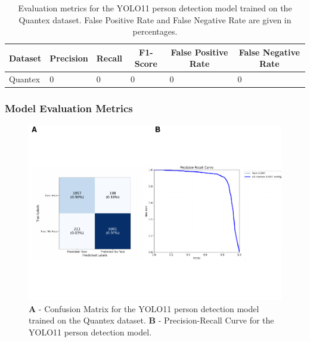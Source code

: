 \documentclass[
  man,floatsintext]{apa6}
\begin{document}
\begin{table}[tbp]

\begin{center}
\begin{threeparttable}

\caption{\label{tab:person-detection-metrics-detailed}Evaluation metrics for the YOLO11 person detection model trained on the Quantex dataset. False Positive Rate and False Negative Rate are given in percentages.}

\begin{tabular}{llllll}
\toprule
Dataset & \multicolumn{1}{c}{Precision} & \multicolumn{1}{c}{Recall} & \multicolumn{1}{c}{F1-Score} & \multicolumn{1}{c}{False Positive Rate} & \multicolumn{1}{c}{False Negative Rate}\\
\midrule
Quantex & 0 & 0 & 0 & 0 & 0\\
\bottomrule
\end{tabular}

\end{threeparttable}
\end{center}

\end{table}

\subsubsection{Model Evaluation Metrics}\label{model-evaluation-metrics}

\begin{figure}

{\centering \includegraphics{Quantex_interaction_paper_files/figure-latex/person-metrics-1} 

}

\caption{\textbf{A} - Confusion Matrix for the YOLO11 person detection model trained on the Quantex dataset. \textbf{B} - Precision-Recall Curve for the YOLO11 person detection model.}\label{fig:person-metrics}
\end{figure}
\end{document}
